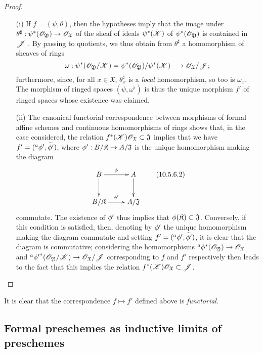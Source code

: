 \begin{proof}
\medskip\noindent
\begin{enumerate}
  \item[\rm{(i)}] If $f=(\psi,\theta)$, then the hypotheses imply that the image under $\theta^\sharp:\psi^*(\sh{O}_\mathfrak{Y})\to\sh{O}_\mathfrak{X}$ of the sheaf of ideals $\psi^*(\mathscr{K})$ of $\psi^*(\mathscr{O}_\mathfrak{Y})$ is contained in $\mathscr{J}$ .
    By passing to quotients, we thus obtain from $\theta^\sharp$ a homomorphism of sheaves of rings
    \[
      \omega:\psi^*(\sh{O}_\mathfrak{Y}/\sh{K})=\psi^*(\sh{O}_\mathfrak{Y})/\psi^*(\sh{K})\to\sh{O}_\mathfrak{X}/\sh{J};
    \]
    furthermore, since, for all $x\in\mathfrak{X}$, $\theta_x^\sharp$ is a \emph{local} homomorphism, so too is $\omega_x$.
    The morphism of ringed spaces $(\psi,\omega^\flat)$ is thus  the unique morphism $f'$ of ringed spaces whose existence was claimed.
  \item[\rm{(ii)}] The canonical functorial correspondence between morphisms of formal affine schemes and continuous homomorphisms of rings  shows that, in the case considered, the relation $f^*(\mathscr{K})\mathscr{O}_\mathfrak{X}\subset\mathfrak{J}$ implies that we have $f'=({}^a\phi',\widetilde{\phi'})$, where $\vphi':B/\mathfrak{K}\to A/\mathfrak{J}$ is the unique homomorphism making the diagram
    \[
    \label{I.10.5.6.2}
      \xymatrix{
        B\ar[r]^\vphi\ar[d] &
        A\ar[d]\\
        B/\mathfrak{K}\ar[r]^{\vphi'} &
        A/\mathfrak{J}
      }
      \tag{10.5.6.2}
    \]
    commutate.
    The existence of $\phi'$ thus implies that $\phi(\mathfrak{K})\subset\mathfrak{J}$.
    Conversely, if this condition is satisfied, then, denoting by $\phi'$ the unique homomorphism making the diagram  commutate and setting $f'=({}^a\phi',\widetilde{\phi'})$, it is clear that the diagram  is commutative; considering the homomorphisms ${}^a\vphi^*(\sh{O}_\mathfrak{Y})\to\sh{O}_\mathfrak{X}$ and ${}^a{\vphi'}^*(\sh{O}_\mathfrak{Y}/\sh{K})\to\sh{O}_\mathfrak{X}/\sh{J}$ corresponding to $f$ and $f'$ respectively then leads to the fact that this implies the relation $f^*(\mathscr{K})\mathscr{O}_\mathfrak{X}\subset\mathscr{J}$.
\end{enumerate}
\end{proof}

It is clear that the correspondence $f\mapsto f'$ defined above is \emph{functorial}.

\subsection{Formal preschemes as inductive limits of preschemes}
\label{subsection:I.10.6}

